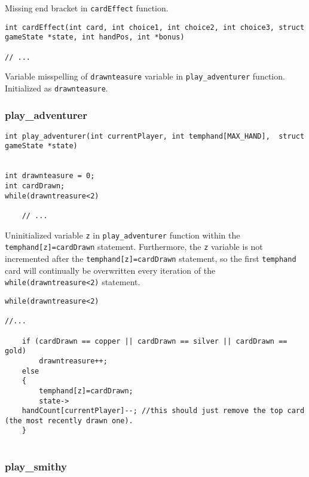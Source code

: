 \documentclass[11pt]{article}
\begin{document}
Missing end bracket in \texttt{cardEffect} function.

\begin{verbatim}
int cardEffect(int card, int choice1, int choice2, int choice3, struct gameState *state, int handPos, int *bonus)

// ...
\end{verbatim}


Variable misspelling of \texttt{drawnteasure} variable in \texttt{play\_adventurer} function. Initialized as \texttt{drawnteasure}.

\subsubsection{play\_adventurer}
\label{sec:playadventurer}

\begin{verbatim}
int play_adventurer(int currentPlayer, int temphand[MAX_HAND],  struct gameState *state)


int drawnteasure = 0;
int cardDrawn;
while(drawntreasure<2)

    // ...
\end{verbatim}

Uninitialized variable \texttt{z} in \texttt{play\_adventurer} function within the \texttt{temphand[z]=cardDrawn} statement. Furthermore, the \texttt{z} variable is not incremented after the \texttt{temphand[z]=cardDrawn} statement, so the first \texttt{temphand} card will continually be overwritten every iteration of the \texttt{while(drawntreasure<2)} statement.


\begin{verbatim}
while(drawntreasure<2)

//...

    if (cardDrawn == copper || cardDrawn == silver || cardDrawn == gold)
        drawntreasure++;
    else
    {
        temphand[z]=cardDrawn;
        state->
    handCount[currentPlayer]--; //this should just remove the top card (the most recently drawn one).
    }


\end{verbatim}

\subsubsection{play\_smithy}
\label{sec:playsmithy}
\end{document}
